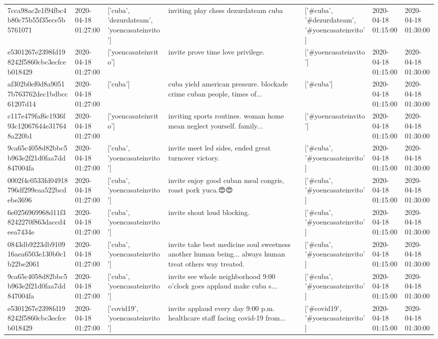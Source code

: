 \begin{tabular}{lllllll}
7cca98ac2e1f94fbc4b80c75b55f35ece5b5761071 & 2020-04-18 01:27:00 & ['cuba', 'dezurdateam', 'yoencasateinvito'] & inviting play chess dezurdateam cuba & ['#cuba', '#dezurdateam', '#yoencasateinvito'] & 2020-04-18 01:15:00 & 2020-04-18 01:30:00 \\
e5301267e2398fd198242f5860cbc3ecfceb018429 & 2020-04-18 01:27:00 & ['yoencasateinvito'] & invite prove time love privilege. & ['#yoencasateinvito'] & 2020-04-18 01:15:00 & 2020-04-18 01:30:00 \\
af302b0ef0d8a90517b763762dec1bdbcc61207d14 & 2020-04-18 01:27:00 & ['cuba'] & cuba yield american pressure. blockade crime cuban people, times of... & ['#cuba'] & 2020-04-18 01:15:00 & 2020-04-18 01:30:00 \\
c117e479faf6c1936f93c12067644e317648a220b1 & 2020-04-18 01:27:00 & ['yoencasateinvito'] & inviting sports routines. woman home mean neglect yourself. family... & ['#yoencasateinvito'] & 2020-04-18 01:15:00 & 2020-04-18 01:30:00 \\
9ca65c4058d82bbc5b963e2f21d0faa7dd847004fa & 2020-04-18 01:27:00 & ['cuba', 'yoencasateinvito'] & invite meet led sides, ended great turnover victory. & ['#cuba', '#yoencasateinvito'] & 2020-04-18 01:15:00 & 2020-04-18 01:30:00 \\
0002f4c0533fd04918796df299eaa522bcdebe3696 & 2020-04-18 01:27:00 & ['cuba', 'yoencasateinvito'] & invite enjoy good cuban meal congris, roast pork yuca.😍😍 & ['#cuba', '#yoencasateinvito'] & 2020-04-18 01:15:00 & 2020-04-18 01:30:00 \\
6e0256969968d11f38242270f863daccd4eea7434e & 2020-04-18 01:27:00 & ['cuba', 'yoencasateinvito'] & invite shout loud blocking. & ['#cuba', '#yoencasateinvito'] & 2020-04-18 01:15:00 & 2020-04-18 01:30:00 \\
0843db9223db910916aea6503e130b0c1b22be2061 & 2020-04-18 01:27:00 & ['cuba', 'yoencasateinvito'] & invite take best medicine soul sweetness another human being... always human treat others way treated. & ['#cuba', '#yoencasateinvito'] & 2020-04-18 01:15:00 & 2020-04-18 01:30:00 \\
9ca65c4058d82bbc5b963e2f21d0faa7dd847004fa & 2020-04-18 01:27:00 & ['cuba', 'yoencasateinvito'] & invite see whole neighborhood 9:00 o'clock goes applaud make cuba s... & ['#cuba', '#yoencasateinvito'] & 2020-04-18 01:15:00 & 2020-04-18 01:30:00 \\
e5301267e2398fd198242f5860cbc3ecfceb018429 & 2020-04-18 01:27:00 & ['covid19', 'yoencasateinvito'] & invite applaud every day 9:00 p.m. healthcare staff facing covid-19 from... & ['#covid19', '#yoencasateinvito'] & 2020-04-18 01:15:00 & 2020-04-18 01:30:00 \\

\end{tabular}
